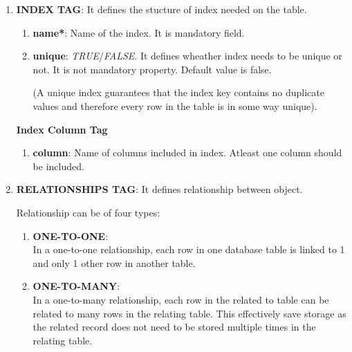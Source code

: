 \begin{enumerate}
\begin{center}
{{						\vspace*{0.0cm} %
				}
			}

		\end{center}


	\item \small \textbf{INDEX TAG}: It defines the stucture of  index needed on the table.

		\begin{enumerate}

			\item \small \textbf{name*}: Name of the index. It is mandatory field.
			\item \small \textbf{unique}: \textit{TRUE}/\textit{FALSE}. It defines wheather index needs to be unique or not. It is not mandatory property. Default value is false.
				
				\par
				(A unique index guarantees that the index key contains no duplicate values and therefore every row in the table is in some way unique). 

		\end{enumerate}


		\par
		\textbf{Index Column Tag}

		\begin{enumerate}

			\item \small \textbf{column}: Name of columns included in index. Atleast one column should be included.

		\end{enumerate}
		

	
	\item \small \textbf{RELATIONSHIPS TAG}: It defines relationship between object.

		\par
		Relationship can be of four types:

		\begin{enumerate}

			\item \small \textbf{ONE-TO-ONE}: \textit{\[<one-to-one>\]} In a one-to-one relationship, each row in one database table is linked to 1 and only 1 other row in another table.

			\item \small \textbf{ONE-TO-MANY}: \textit{\[<one-to-many>\]} In a one-to-many relationship, each row in the related to table can be related to many rows in the relating table. This effectively save storage as the related record does not need to be stored multiple times in the relating table.


\end{enumerate}
\end{enumerate}
